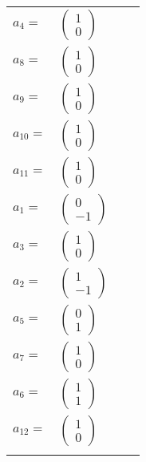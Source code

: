 \documentclass[1p]{elsarticle_modified}
\theoremstyle{definition}
\begin{document}
\begin{tabular}{m{7pt} m{180pt} m{7pt} m{180pt} }
\flushright $a_{4}=$&$\begin{pmatrix}1\\0\end{pmatrix}$ \\
\flushright $a_{8}=$&$\begin{pmatrix}1\\0\end{pmatrix}$ \\
\flushright $a_{9}=$&$\begin{pmatrix}1\\0\end{pmatrix}$ \\
\flushright $a_{10}=$&$\begin{pmatrix}1\\0\end{pmatrix}$ \\
\flushright $a_{11}=$&$\begin{pmatrix}1\\0\end{pmatrix}$ \\
\flushright $a_{1}=$&$\begin{pmatrix}0\\-1\end{pmatrix}$ \\
\flushright $a_{3}=$&$\begin{pmatrix}1\\0\end{pmatrix}$ \\
\flushright $a_{2}=$&$\begin{pmatrix}1\\-1\end{pmatrix}$ \\
\flushright $a_{5}=$&$\begin{pmatrix}0\\1\end{pmatrix}$ \\
\flushright $a_{7}=$&$\begin{pmatrix}1\\0\end{pmatrix}$ \\
\flushright $a_{6}=$&$\begin{pmatrix}1\\1\end{pmatrix}$ \\
\flushright $a_{12}=$&$\begin{pmatrix}1\\0\end{pmatrix}$\\&\end{tabular}
\end{document}
